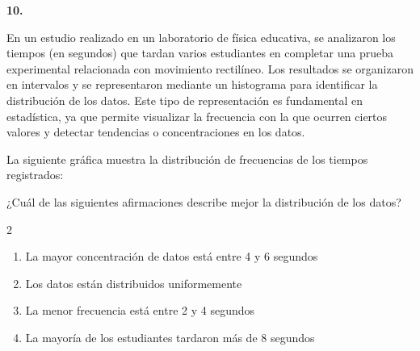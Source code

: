 \textbf{10.}

En un estudio realizado en un laboratorio de física educativa, se analizaron los tiempos (en segundos) que tardan varios estudiantes en completar una prueba experimental relacionada con movimiento rectilíneo. Los resultados se organizaron en intervalos y se representaron mediante un histograma para identificar la distribución de los datos. Este tipo de representación es fundamental en estadística, ya que permite visualizar la frecuencia con la que ocurren ciertos valores y detectar tendencias o concentraciones en los datos.

La siguiente gráfica muestra la distribución de frecuencias de los tiempos registrados:

\begin{center}
\end{center}

¿Cuál de las siguientes afirmaciones describe mejor la distribución de los datos?

\begin{multicols}{2}
\begin{enumerate}[label=\alph*), leftmargin=*]
\item La mayor concentración de datos está entre 4 y 6 segundos
\item Los datos están distribuidos uniformemente
\item La menor frecuencia está entre 2 y 4 segundos
\item La mayoría de los estudiantes tardaron más de 8 segundos
\end{enumerate}
\end{multicols}